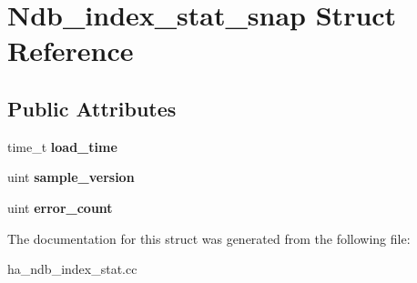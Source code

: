 \hypertarget{structNdb__index__stat__snap}{}\section{Ndb\+\_\+index\+\_\+stat\+\_\+snap Struct Reference}
\label{structNdb__index__stat__snap}
\subsection*{Public Attributes}
\begin{DoxyCompactItemize}
\item 
\mbox{\label{structNdb__index__stat__snap_af134192efb0922ebe1055e7903ebb3f9}} 
time\+\_\+t {\bfseries load\+\_\+time}
\item 
\mbox{\label{structNdb__index__stat__snap_aba3c72cfb4d7e27cf4932730434f04b7}} 
uint {\bfseries sample\+\_\+version}
\item 
\mbox{\label{structNdb__index__stat__snap_ae4f635d37b5a6d44ed9df12bc36d3204}} 
uint {\bfseries error\+\_\+count}
\end{DoxyCompactItemize}


The documentation for this struct was generated from the following file\+:\begin{DoxyCompactItemize}
\item 
ha\+\_\+ndb\+\_\+index\+\_\+stat.\+cc\end{DoxyCompactItemize}
